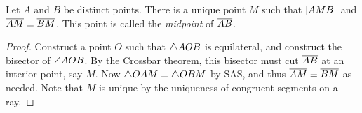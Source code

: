 \begin{construct}
Let \(A\) and \(B\) be distinct points.
There is a unique point \(M\) such that \([ A M B ]\) and \(\overline{AM} \equiv \overline{BM}\).
This point is called the \emph{midpoint} of \(\overline{AB}\).
\end{construct}

\begin{proof}
Construct a point \(O\) such that \(\bigtriangleup{AOB}\) is equilateral, and construct the bisector of \(\angle{AOB}\).
By the Crossbar theorem, this bisector must cut \(\overline{AB}\) at an interior point, say \(M\).
Now \(\bigtriangleup{OAM} \equiv \bigtriangleup{OBM}\) by SAS, and thus \(\overline{AM} \equiv \overline{BM}\) as needed.
Note that \(M\) is unique by the uniqueness of congruent segments on a ray.
\end{proof}
